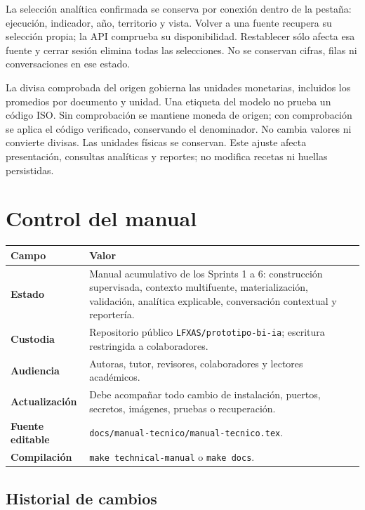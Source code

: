 \documentclass[11pt,letterpaper]{article}
\newcommand{\file}[1]{\texttt{#1}}
\begin{document}
La selección analítica confirmada se conserva por conexión dentro de la pestaña:
ejecución, indicador, año, territorio y vista. Volver a una fuente recupera su
selección propia; la API comprueba su disponibilidad. Restablecer sólo afecta esa
fuente y cerrar sesión elimina todas las selecciones. No se conservan cifras,
filas ni conversaciones en ese estado.

La divisa comprobada del origen gobierna las unidades monetarias, incluidos los
promedios por documento y unidad. Una etiqueta del modelo no prueba un código ISO.
Sin comprobación se mantiene moneda de origen; con comprobación se aplica el código
verificado, conservando el denominador. No cambia valores ni convierte divisas.
Las unidades físicas se conservan. Este ajuste afecta presentación, consultas
analíticas y reportes; no modifica recetas ni huellas persistidas.

\section{Control del manual}

\begin{tabularx}{\textwidth}{@{}>{\bfseries}p{}X@{}}
  \toprule
  Campo & Valor \\
  \midrule
  Estado & Manual acumulativo de los Sprints 1 a 6: construcción supervisada, contexto multifuente, materialización, validación, analítica explicable, conversación contextual y reportería. \\
  Custodia & Repositorio público \file{LFXAS/prototipo-bi-ia}; escritura restringida a colaboradores. \\
  Audiencia & Autoras, tutor, revisores, colaboradores y lectores académicos. \\
  Actualización & Debe acompañar todo cambio de instalación, puertos, secretos, imágenes, pruebas o recuperación. \\
  Fuente editable & \file{docs/manual-tecnico/manual-tecnico.tex}. \\
  Compilación & \file{make technical-manual} o \file{make docs}. \\
  \bottomrule
\end{tabularx}

\subsection*{Historial de cambios}
\end{document}
